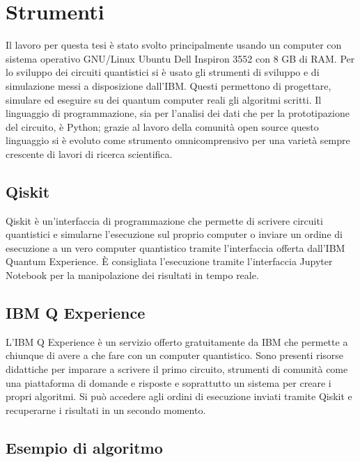 \chapter{Strumenti}\label{ch:strumenti}

Il lavoro per questa tesi è stato svolto principalmente usando un computer 
con sistema operativo GNU/Linux Ubuntu Dell Inspiron 3552 con 8 GB di RAM. 
Per lo sviluppo dei circuiti quantistici si è usato gli strumenti di 
sviluppo e di simulazione messi a disposizione dall'IBM. Questi permettono 
di progettare, simulare ed eseguire su dei quantum computer reali gli 
algoritmi scritti. Il linguaggio di programmazione, sia per l'analisi 
dei dati che per la prototipazione del circuito, è Python; grazie al 
lavoro della comunità open source questo linguaggio si è evoluto 
come strumento omnicomprensivo per una varietà sempre crescente di 
lavori di ricerca scientifica. 

\section{Qiskit}

Qiskit \cite{Qiskit} è un'interfaccia di programmazione che permette di scrivere 
circuiti quantistici e simularne l'esecuzione sul proprio computer 
o inviare un ordine di esecuzione a un vero computer quantistico tramite 
l'interfaccia offerta dall'IBM Quantum Experience. 
È consigliata l'esecuzione tramite l'interfaccia Jupyter Notebook per 
la manipolazione dei risultati in tempo reale. 

\section{IBM Q Experience}

L'IBM Q Experience è un servizio offerto gratuitamente da IBM che permette 
a chiunque di avere a che fare con un computer quantistico. Sono presenti 
risorse didattiche per imparare a scrivere il primo circuito, strumenti 
di comunità come una piattaforma di domande e risposte e soprattutto 
un sistema per creare i propri algoritmi. Si può accedere agli ordini di 
esecuzione inviati tramite Qiskit e recuperarne i risultati in un 
secondo momento. 

\section{Esempio di algoritmo}

